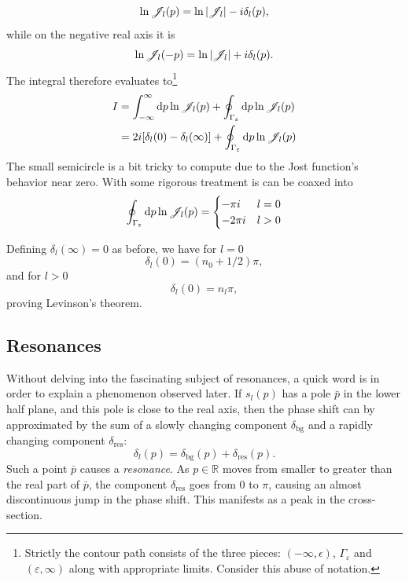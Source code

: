 \begin{equation*}
  \ln\mathscr{J}_{l}(p) = \ln|\mathscr{J}_{l}| - i\delta_{l}(p),
\end{equation*}
while on the negative real axis it is
\begin{equation*}
  \ln\mathscr{J}_{l}(-p) = \ln|\mathscr{J}_{l}| + i\delta_{l}(p).
\end{equation*}
The integral therefore evaluates to\footnote{Strictly the contour path consists of the
  three pieces: \((-\infty, \epsilon)\), \(\Gamma_{\varepsilon}\) and
  \((\varepsilon, \infty)\) along with appropriate limits. Consider this abuse
  of notation.}
\begin{align*}
  I &= \int_{-\infty}^{\infty} \dd p \ln\mathscr{J}_{l}(p) + \oint_{\Gamma_{\varepsilon}}\dd p \ln\mathscr{J}_{l}(p)\\
  &= 2i[\delta_{l}(0)-\delta_{l}(\infty)] + \oint_{\Gamma_{\varepsilon}}\dd p \ln\mathscr{J}_{l}(p)\\
\end{align*}
The small semicircle is a bit tricky to compute due to the Jost function's behavior near
zero. With some rigorous treatment is can be coaxed into\cite[p.~234]{taylor}
\begin{equation*}
  \oint_{\Gamma_{\varepsilon}}\dd p \ln\mathscr{J}_{l}(p) =
  \begin{cases}
    -\pi i & l=0\\
    -2\pi i & l > 0
  \end{cases}
\end{equation*}

Defining \(\delta_{l}(\infty)=0\) as before, we have for \(l=0\)
\begin{equation*}
  \delta_{l}(0)= (n_{0}+1/2)\pi,
\end{equation*}
and for \(l>0\)
\begin{equation*}
  \delta_{l}(0)  = n_{l}\pi,
\end{equation*}
proving Levinson's theorem.

\subsection{Resonances}
\label{sec:resonances}

Without delving into the fascinating subject of resonances, a quick word is in
order to explain a phenomenon observed later. If \(s_{l}(p)\) has a pole \(\bar{p}\) in the
lower half plane, and this pole is close to the real axis, then the phase shift
can by approximated by the sum of a slowly changing component
\(\delta_{\text{bg}}\) and a rapidly changing component \(\delta_{\text{res}}\):
\begin{equation*}
  \delta_{l}(p) = \delta_{\text{bg}}(p) + \delta_{\text{res}}(p).
\end{equation*}
Such a point \(\bar{p}\) causes a \textit{resonance}.
As \(p\in\mathbb{R}\) moves from smaller to greater than the real part of
\(\bar{p}\), the component \(\delta_{\text{res}}\) goes from \(0\) to \(\pi\),
causing an almost discontinuous jump in the phase shift. This manifests as a
peak in the cross-section.

